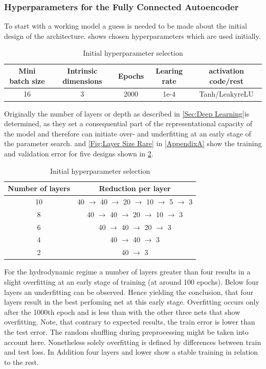 \documentclass[12pt, a4paper]{article}
\begin{document}
\subsubsection{Hyperparameters for the Fully Connected Autoencoder}\label{Fully Connected}
To start with a working model a guess is needed to be made about the initial design of the architecture.  shows chosen hyperparameters  which are used initially.
\begin{table}[!htbp]\centering
	\begin{tabular}{ |c|c|c|c|c| }
		\hline
		Mini batch size & Intrinsic dimensions& Epochs & Learing rate & activation code/rest\\ [.5ex]
		\hline
		16 & 3 & 2000& 1e-4 & Tanh/LeakyreLU\\ \hline
	\end{tabular}
	\caption{Initial hyperparameter selection}
	\label{Tab:First Guess}
\end{table}
Originally the number of layers or depth as described in \cref{Sec:Deep Learning}is determined, as they set a consequential part of the representational capacity of the model and therefore can initiate over- and underfitting at an early stage of the parameter search.  and \cref{Fig:Layer Size Rare} in \cref{AppendixA} show the training and validation error for five designs shown in \cref{Tab:Layer Size}.\\
\begin{table}[!htbp]\centering
	\begin{tabular}{ |c|c| }
		\hline
		Number of layers & Reduction per layer \\ [.5ex]
		\hline
		10 & 40 \(\rightarrow\) 40 \(\rightarrow\) 20  \(\rightarrow\) 10 \(\rightarrow\) 5 \(\rightarrow\) 3\\ \hline
		8 & 40 \(\rightarrow\) 40 \(\rightarrow\) 20  \(\rightarrow\) 10 \(\rightarrow\) 3\\ \hline
		6 & 40 \(\rightarrow\) 40 \(\rightarrow\) 20  \(\rightarrow\) 3\\ \hline
		4 & 40 \(\rightarrow\) 40 \(\rightarrow\) 3\\ \hline
		2 & 40 \(\rightarrow\) 3\\ \hline
	\end{tabular}
	\caption{Initial hyperparameter selection}
	\label{Tab:Layer Size}
\end{table}
For the hydrodynamic regime a number of layers greater than four results in a slight overfitting at an early stage of training (at around 100 epochs). Below four layers an underfitting can be observed. Hence yielding the conclusion, that four layers result in the best perfoming net at this early stage. Overfitting occurs only after the 1000th epoch and is less than with the other three nets that show overfitting. Note, that contrary to expected results, the train error is lower than the test error. The random shuffling during preprocessing might be taken into account here. Nonetheless solely overfitting is defined by differences between train and test loss. In Addition four layers and lower show a stable training in relation to the rest.\\
\end{document}
